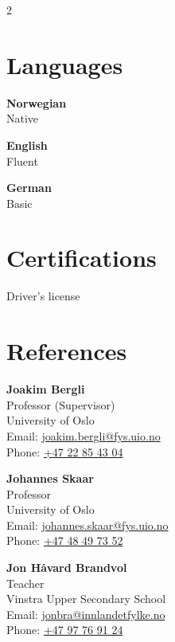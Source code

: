 \documentclass[a4paper,10pt]{article}
\begin{document}
\begin{paracol}{2}
\section*{Languages}
\textbf{Norwegian} \\
Native

\textbf{English} \\
Fluent

\textbf{German} \\
Basic

\section*{Certifications}
Driver’s license

\section*{References}
\textbf{Joakim Bergli} \\
Professor (Supervisor) \\
University of Oslo \\
Email: \href{mailto:joakim.bergli@fys.uio.no}{joakim.bergli@fys.uio.no} \\
Phone: \href{tel:+4722854304}{+47 22 85 43 04} 

\vspace{0.3cm} 

\textbf{Johannes Skaar} \\
Professor \\
University of Oslo \\
Email: \href{mailto:johannes.skaar@fys.uio.no}{johannes.skaar@fys.uio.no} \\
Phone: \href{tel:+4748497352}{+47 48 49 73 52} 

\vspace{0.3cm}

\textbf{Jon Håvard Brandvol} \\
Teacher \\
Vinstra Upper Secondary School \\
Email: \href{mailto:jonbra@innlandetfylke.no}{jonbra@innlandetfylke.no} \\
Phone: \href{tel:+4797769124}{+47 97 76 91 24}

\end{paracol}
\end{document}
